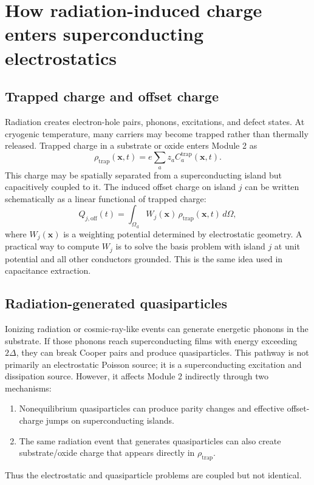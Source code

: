 \documentclass[11pt]{article}
\newcommand{\Omd}{\Omega_{\mathrm{d}}}
\newcommand{\rhotrap}{\rho_{\mathrm{trap}}}
\newcommand{\DeltaSC}{\Delta}
\begin{document}
\section{How radiation-induced charge enters superconducting electrostatics}

\subsection{Trapped charge and offset charge}

Radiation creates electron-hole pairs, phonons, excitations, and defect states. At cryogenic temperature, many carriers may become trapped rather than thermally released. Trapped charge in a substrate or oxide enters Module 2 as
\begin{equation}
\rhotrap(\mathbf{x},t)=e\sum_a z_a C_a^{\mathrm{trap}}(\mathbf{x},t).
\end{equation}
This charge may be spatially separated from a superconducting island but capacitively coupled to it. The induced offset charge on island $j$ can be written schematically as a linear functional of trapped charge:
\begin{equation}
Q_{j,\mathrm{off}}(t)=\int_{\Omd} W_j(\mathbf{x})\,\rhotrap(\mathbf{x},t)\,d\Omega,
\label{eq:weighting_potential_offset_charge}
\end{equation}
where $W_j(\mathbf{x})$ is a weighting potential determined by electrostatic geometry. A practical way to compute $W_j$ is to solve the basis problem with island $j$ at unit potential and all other conductors grounded. This is the same idea used in capacitance extraction.

\subsection{Radiation-generated quasiparticles}

Ionizing radiation or cosmic-ray-like events can generate energetic phonons in the substrate. If those phonons reach superconducting films with energy exceeding $2\DeltaSC$, they can break Cooper pairs and produce quasiparticles. This pathway is not primarily an electrostatic Poisson source; it is a superconducting excitation and dissipation source. However, it affects Module 2 indirectly through two mechanisms:
\begin{enumerate}[leftmargin=2em]
\item Nonequilibrium quasiparticles can produce parity changes and effective offset-charge jumps on superconducting islands.
\item The same radiation event that generates quasiparticles can also create substrate/oxide charge that appears directly in $\rhotrap$.
\end{enumerate}
Thus the electrostatic and quasiparticle problems are coupled but not identical.
\end{document}
